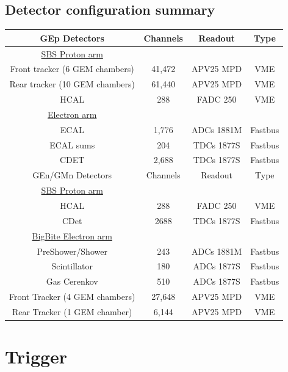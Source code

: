 \documentclass{article}
\begin{document}
 


\subsection{Detector configuration summary}
\begin{tabular}{|c|c|c|c|}
\hline
GEp Detectors & Channels& Readout & Type \\
\hline
\underline{SBS Proton arm} & & & \\
Front tracker (6 GEM chambers) & 41,472 & APV25 MPD& VME\\
Rear tracker (10 GEM chambers) & 61,440& APV25 MPD& VME\\
HCAL & 288 & FADC 250 &VME\\
\hline
\underline{Electron arm} & & & \\
ECAL & 1,776 & ADCs 1881M &Fastbus\\
ECAL sums& 204 & TDCs 1877S &Fastbus\\
CDET & 2,688 & TDCs 1877S &Fastbus \\
\hline
\hline
GEn/GMn Detectors & Channels& Readout & Type \\
\hline
\underline{SBS Proton arm} & & & \\
HCAL & 288 & FADC 250 &VME\\
CDet & 2688 & TDCs 1877S&Fastbus\\
\hline
\underline{BigBite Electron arm} & & & \\
PreShower/Shower & 243 & ADCs 1881M&Fastbus\\
Scintillator & 180& ADCs 1877S&Fastbus\\
Gas Cerenkov & 510& ADCs 1877S&Fastbus\\
Front Tracker (4 GEM chambers) & 27,648 & APV25 MPD &VME\\
Rear Tracker (1 GEM chamber) & 6,144& APV25 MPD &VME\\
\hline
\end{tabular}

\section{Trigger}
\end{document}
